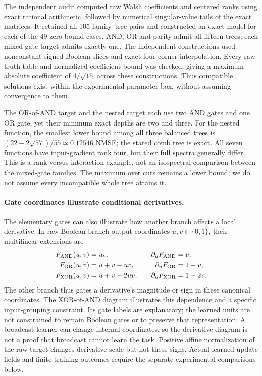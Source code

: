 The independent audit computed raw Walsh coefficients and centered ranks
using exact rational arithmetic, followed by numerical singular-value tails
of the exact matrices. It retained all 105 family--tree pairs and constructed
an exact model for each of the 49 zero-bound cases. AND, OR and parity admit
all fifteen trees; each mixed-gate target admits exactly one. The independent
constructions used nonconstant signed Boolean slices and exact four-corner
interpolation. Every raw truth table and normalized coefficient bound was
checked, giving a maximum absolute coefficient of $4/\sqrt{15}$ across these
constructions. Thus
compatible solutions exist within the experimental parameter box, without
assuming convergence to them.

The OR-of-AND target and the nested target each use two AND gates and one OR
gate, yet their minimum exact depths are two and three. For the nested
function, the smallest lower bound among all three balanced trees is
$(22-2\sqrt{57})/55\simeq0.12546$ NMSE; the stated comb tree is exact.
All seven functions have input-gradient rank four, but their full spectra
generally differ. This is a rank-versus-interaction example, not an
isospectral comparison between the mixed-gate families. The maximum over
cuts remains a lower bound; we do not assume every incompatible whole tree
attains it.

\paragraph{Gate coordinates illustrate conditional derivatives.}
The elementary gates can also illustrate how another branch affects a
local derivative. In raw Boolean branch-output coordinates
$u,v\in\{0,1\}$, their multilinear extensions are
\begin{align}
 F_{\rm AND}(u,v)&=uv,&\quad \partial_uF_{\rm AND}&=v,\\
 F_{\rm OR}(u,v)&=u+v-uv,& \partial_uF_{\rm OR}&=1-v,\\
 F_{\rm XOR}(u,v)&=u+v-2uv,& \partial_uF_{\rm XOR}&=1-2v.
\end{align}
The other branch thus gates a derivative's magnitude or sign in these
canonical coordinates. The XOR-of-AND diagram illustrates this dependence
and a specific input-grouping constraint. Its gate labels are explanatory;
the learned units are not constrained to remain Boolean gates or to preserve
that representation. A broadcast learner can change internal coordinates,
so the derivative diagram is not a proof that broadcast cannot learn the
task. Positive affine normalization of the raw target changes derivative
scale but not these signs. Actual learned update fields and finite-training
outcomes require the separate experimental comparisons below.

